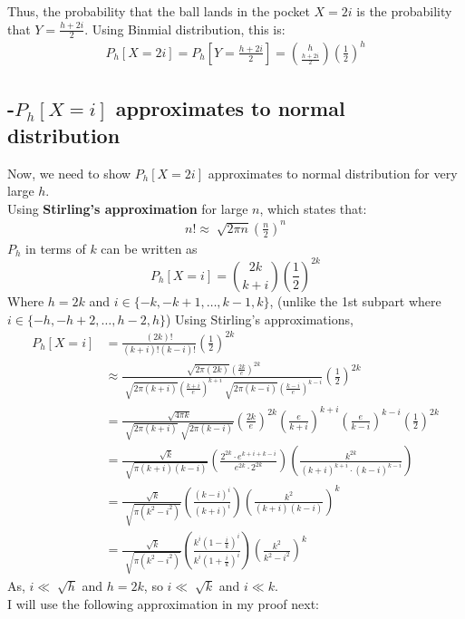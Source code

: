 \begin{solution}
	Thus, the probability that the ball lands in the pocket $X=2i$ is the
	probability that $Y = \frac{h+2i}{2}$. Using Binmial distribution, this
	is:
	\begin{align}
		P_h[X=2i]=P_h\left[Y=\frac{h+2i}{2}\right]=\binom{h}{\frac{h+2i}{2}}\left(\frac{1}{2}\right)^h
	\end{align}

	\subsection*{-$P_h[X=i]$ approximates to normal distribution }
	Now, we need to show $P_h[X=2i]$ approximates to normal distribution for very large $h$.\\
	 Using \textbf{Stirling's approximation} for large $n$, which states that:
	 \begin{align}
	 	n!\approx \sqrt[]{2\pi n}\left(\frac{n}{2}\right)^n
	 \end{align}
	$P_h$ in terms of $k$ can be written as
	\[P_h[X=i] = \binom{2k}{k+i}\left(\frac{1}{2}\right)^{2k}\]
	Where $h=2k$ and $i\in\{-k,-k+1,\ldots,k-1,k\}$, (unlike the 1st subpart where $i\in\{-h,-h+2,\ldots,h-2,h\}$)
	Using Stirling's approximations,
	\begin{align}
		P_h[X=i] & = \frac{(2k)!}{(k+i)!(k-i)!}\left(\frac{1}{2}\right)^{2k} \\
		& \approx \frac{\sqrt[]{2\pi(2k)}\left(\frac{2k}{e}\right)^{2k}}{\sqrt[]{2\pi(k+i)}\left(\frac{k+i}{e}\right)^{k+i}\sqrt[]{2\pi(k-i)}\left(\frac{k-i}{e}\right)^{k-i}}\left(\frac{1}{2}\right)^{2k} \\
		& = \frac{\sqrt[]{4\pi k}}{\sqrt[]{2\pi (k+i)}\sqrt[]{2\pi (k-i)}} \left(\frac{2k}{e}\right)^{2k}\left(\frac{e}{k+i}\right)^{k+i}\left(\frac{e}{k-i}\right)^{k-i}\left(\frac{1}{2}\right)^{2k} \\
		& = \frac{\sqrt[]{k}}{\sqrt[]{\pi (k+i)(k-i)}}\left(\frac{2^{2k}\cdot e^{k+i+k-i}}{e^{2k}\cdot2^{2k}}\right) \left(\frac{k^{2k}}{(k+i)^{k+i}\cdot (k-i)^{k-i}}\right) \\
		& = \frac{\sqrt[]{k}}{\sqrt[]{\pi (k^2-i^2)}}\left(\frac{(k-i)^i}{(k+i)^i}\right)\left(\frac{k^2}{(k+i)(k-i)}\right)^k \\
		& = \frac{\sqrt[]{k}}{\sqrt[]{\pi (k^2-i^2)}}\left(\frac{k^i\left(1-\frac{i}{k}\right)^i}{k^i\left(1+\frac{i}{k}\right)^i}\right)\left(\frac{k^2}{k^2-i^2}\right)^k
	\end{align}
	As, $i\ll \sqrt[]{h}$ and $h=2k$, so $i\ll \sqrt[]{k}$ and $i\ll k$. \\
	I will use the following approximation in my proof next:

\end{solution}
